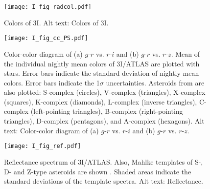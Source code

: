 \documentclass[]{pasj02}
\newcommand\I{3I/ATLAS\xspace}
\begin{document}
\begin{figure*}
 \begin{center}
  \texttt{[image: I\_fig\_radcol.pdf]} 
 \end{center}
\caption{
    Colors of 3I.
    {Alt text: Colors of 3I.} 
}\label{fig:radcol}
\end{figure*}


\begin{figure}
 \begin{center}
  \texttt{[image: I\_fig\_cc\_PS.pdf]} 
 \end{center}
\caption{
    Color-color diagram of (a) $g$-$r$ vs. $r$-$i$ and (b) $g$-$r$ vs. $r$-$z$.
    Mean of the individual nightly mean colors of 3I/ATLAS are plotted with stars. 
    Error bars indicate the standard deviation of nightly mean colors.
    Error bars indicate the 1$\sigma$ uncertainties.
    Asteroids from \citep{Sergeyev2021} are also plotted: 
    S-complex (circles), 
    V-complex (triangles),
    X-complex (squares),
    K-complex (diamonds),
    L-complex (inverse triangles),
    C-complex (left-pointing triangles),
    B-complex (right-pointing triangles),
    D-complex (pentagons),
    and 
    A-complex (hexagons). 
    {Alt text: Color-color diagram of (a) $g$-$r$ vs. $r$-$i$ and (b) $g$-$r$ vs. $r$-$z$.} 
}\label{fig:cc}
\end{figure}


\begin{figure}
 \begin{center}
  \texttt{[image: I\_fig\_ref.pdf]} 
 \end{center}
\caption{
Reflectance spectrum of \I.
Also, Mahlke templates of S-, D- and Z-type asteroids are shown \citep{Mahlke2022}.
Shaded areas indicate the standard deviations of the template spectra. 
    {Alt text: Reflectance.} 
}\label{fig:ref}
\end{figure}
\end{document}

